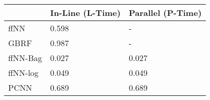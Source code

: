 \begin{tabular}{lll}
\toprule
{} & In-Line (L-Time) & Parallel (P-Time) \\
\midrule
ffNN     &            0.598 &                 - \\
GBRF     &            0.987 &                 - \\
ffNN-Bag &            0.027 &             0.027 \\
ffNN-log &            0.049 &             0.049 \\
PCNN     &            0.689 &             0.689 \\
\bottomrule
\end{tabular}
